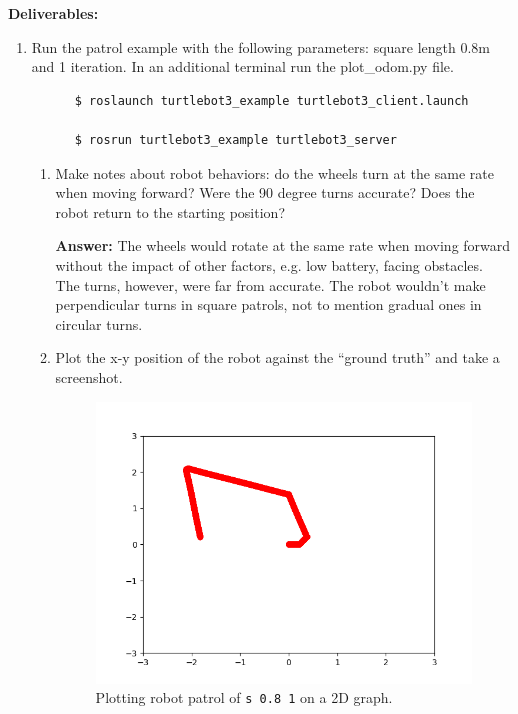 \documentclass[12pt]{article}
\begin{document}
\textbf{Deliverables:}
\begin{enumerate}
    
    \item Run the patrol example with the following parameters: square length 0.8m and 1 iteration. In an additional terminal run the plot\_odom.py file.
    
    \begin{verbatim}
      $ roslaunch turtlebot3_example turtlebot3_client.launch
      
      $ rosrun turtlebot3_example turtlebot3_server
    \end{verbatim}

    \begin{enumerate}

        \item Make notes about robot behaviors: do the wheels turn at the same rate when moving forward? Were the 90 degree turns accurate? Does the robot return to the starting position?
        
        \textbf{Answer: }The wheels would rotate at the same rate when moving forward without the impact of other factors, e.g. low battery, facing obstacles.
        \\The turns, however, were far from accurate. The robot wouldn't make perpendicular turns in square patrols, not to mention gradual ones in circular turns. 

        \item Plot the x-y position of the robot against the “ground truth” and take a screenshot.
        
        \begin{figure}[H]
          \centering\includegraphics[width=14cm]{images/gmapping.png}\vspace{-10pt}
          \caption{Plotting robot patrol of \texttt{s 0.8 1} on a 2D graph.}\label{fig:gmapping}
          \end{figure}


\end{enumerate}
\end{enumerate}
\end{document}
